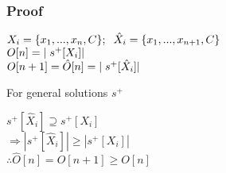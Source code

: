 \documentclass[11pt]{article}
\begin{document}
\subsubsection{Proof}
\begin{center}
$
X_i = \{x_1,...,x_n,C\}; \hspace{2mm} \hat{X}_i = \{x_1,...,x_{n+1},C\}
$
\\ \vspace{4mm}
$
O[n] = |\hspace{1mm} s^+[X_i]|
$
\\ \vspace{2mm}
$
O[n+1] = \hat{O}[n] = |\hspace{1mm} s^+[\hat{X}_i]|
$
\end{center}
\hspace{4mm}
For general solutions $s^+$
\begin{center}
$
s^+[\hat{X}_i] \supseteq s^+[X_i] 
$
\\ \vspace{2mm}
$
\Rightarrow |s^+[\hat{X}_i]| \geq |s^+[X_i]|
$
\\ \vspace{2mm}
$
\therefore \hat{O}[n] = O[n+1] \geq O[n]
$
\end{center}












\end{document}
